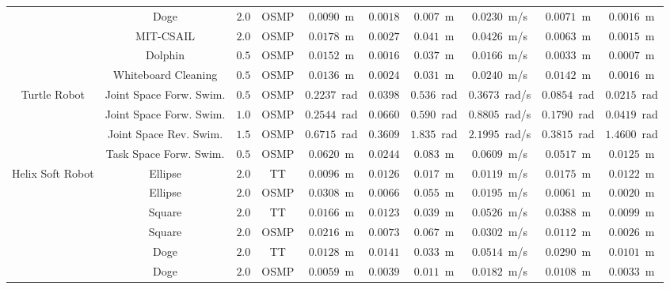 \begin{table}
\begin{tiny}
\begin{tabular}{|c | ccc | cccc | cc |}
        & Doge & $2.0$ & \gls{OSMP} & $0.0090$~m & $0.0018$ & $0.007$~m & $0.0230$~m/s & $0.0071$~m & $0.0016$~m \\
        & MIT-CSAIL & $2.0$ & \gls{OSMP} & $0.0178$~m & $0.0027$ & $0.041$~m & $0.0426$~m/s & $0.0063$~m & $0.0015$~m \\
        & Dolphin & $0.5$ & \gls{OSMP} & $0.0152$~m & $0.0016$ & $0.037$~m & $0.0166$~m/s & $0.0033$~m & $0.0007$~m \\
        & Whiteboard Cleaning & $0.5$ & \gls{OSMP} & $0.0136$~m & $0.0024$ & $0.031$~m & $0.0240$~m/s & $0.0142$~m & $0.0016$~m \\
        \midrule
        \multirow{4}{*}{Turtle Robot} & Joint Space Forw. Swim. & $0.5$ & \gls{OSMP} & $0.2237$~rad & $0.0398$ & $0.536$~rad & $0.3673$~rad/s & $0.0854$~rad & $0.0215$~rad \\
        & Joint Space Forw. Swim. & $1.0$ & \gls{OSMP} & $0.2544$~rad & $0.0660$ & $0.590$~rad & $0.8805$~rad/s & $0.1790$~rad & $0.0419$~rad \\
        & Joint Space Rev. Swim. & $1.5$ & \gls{OSMP} & $0.6715$~rad & $0.3609$ & $1.835$~rad & $2.1995$~rad/s & $0.3815$~rad & $1.4600$~rad \\
        & Task Space Forw. Swim. & $0.5$ & \gls{OSMP} & $0.0620$~m & $0.0244$ & $0.083$~m & $0.0609$~m/s & $0.0517$~m & $0.0125$~m \\
        \midrule
        \multirow{6}{*}{Helix Soft Robot} & Ellipse & $2.0$ & \gls{TT} & $0.0096$~m & $0.0126$ & $0.017$~m & $0.0119$~m/s & $0.0175$~m & $0.0122$~m \\
        & Ellipse & $2.0$ & \gls{OSMP} & $0.0308$~m & $0.0066$ & $0.055$~m & $0.0195$~m/s & $0.0061$~m & $0.0020$~m \\
        & Square & $2.0$ & \gls{TT} & $0.0166$~m & $0.0123$ & $0.039$~m & $0.0526$~m/s & $0.0388$~m & $0.0099$~m \\
        & Square & $2.0$ & \gls{OSMP} & $0.0216$~m & $0.0073$ & $0.067$~m & $0.0302$~m/s & $0.0112$~m & $0.0026$~m \\
        & Doge & $2.0$ & \gls{TT} & $0.0128$~m & $0.0141$ & $0.033$~m & $0.0514$~m/s & $0.0290$~m & $0.0101$~m \\
        & Doge & $2.0$ & \gls{OSMP} & $0.0059$~m & $0.0039$ & $0.011$~m & $0.0182$~m/s & $0.0108$~m & $0.0033$~m \\
        \bottomrule
    \end{tabular}
    \end{tiny}
\end{table}


